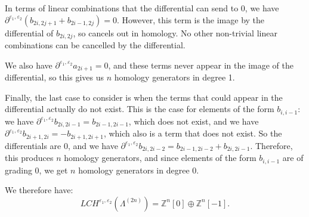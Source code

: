 \documentclass[11pt]{amsart}
\theoremstyle{plain}
\theoremstyle{remark}
\numberwithin{equation}{section}
\newcommand{\Z}{\ensuremath{\mathbb{Z}}}
\begin{document}
In terms of linear combinations that the differential can send to 0, we have $\partial^{\varepsilon_1, \varepsilon_2} (b_{2i,2j+1} + b_{2i-1,2j})=0$. However, this term is the image by the differential of $b_{2i,2j}$, so cancels out in homology. No other non-trivial linear combinations can be cancelled by the differential.

We also have $\partial^{\varepsilon_1, \varepsilon_2}a_{2i+1} = 0$, and these terms never appear in the image of the differential, so this gives us $n$ homology generators in degree 1.

Finally, the last case to consider is when the terms that could appear in the differential actually do not exist. This is the case for elements of the form $b_{i,i-1}$: we have $\partial^{\varepsilon_1, \varepsilon_2} b_{2i,2i-1} = b_{2i-1,2i-1}$, which does not exist, and we have $\partial^{\varepsilon_1, \varepsilon_2} b_{2i+1,2i} = -b_{2i+1,2i+1}$, which also is a term that does not exist. So the differentials are 0, and we have $\partial^{\varepsilon_1, \varepsilon_2} b_{2i, 2i-2} = b_{2i-1,2i-2} + b_{2i, 2i-1}$. Therefore, this produces $n$ homology generators, and since elements of the form $b_{i,i-1}$ are of grading 0, we get $n$ homology generators in degree 0.

We therefore have:
 $$
 LCH^{\varepsilon_1,\varepsilon_2}(\Lambda^{(2n)}) = \Z^n[0] \oplus \Z^n[-1].
 $$
 
 
 
\end{document}
